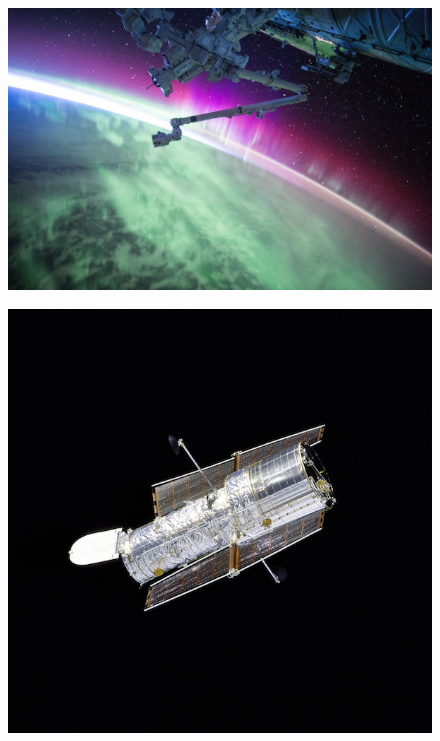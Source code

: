 \documentclass[final, 12pt]{beamer}
\newlength{\onecolwid}
\newlength{\twocolwid}
\begin{document}
\begin{frame}[t]
\begin{columns}[t]
\begin{column}{\onecolwid}
\begin{column}{\twocolwid}
\begin{figure}
\begin{minipage}{.67\textwidth}
  \centering
  \includegraphics[width=0.95\linewidth]{img/nasa-43567}\hspace*{1.5em}
  \label{fig:fig1}
\end{minipage}\hspace*{1em}%
\begin{minipage}{.45\textwidth}
  \centering
  \includegraphics[width=0.95\linewidth]{img/nasa-45070}\hspace*{1.5em}
  \label{fig:fig2}
\end{minipage}
\end{figure}
\end{column}


\end{column}
\end{columns}
\end{frame}
\end{document}
